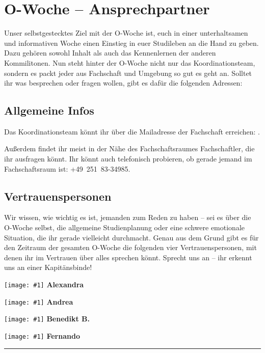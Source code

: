 \newcommand{\fibelvp}[2]{
	\minipage{0.24\textwidth}
		\begin{centering}
			\texttt{[image: \#1]}
			\textbf{#2}
		\end{centering}
	\endminipage\hfill
}

\section{O-Woche -- Ansprechpartner}

Unser selbstgestecktes Ziel mit der O-Woche ist, euch in einer unterhaltsamen und informativen Woche einen
Einstieg in euer Studileben an die Hand zu geben. Dazu gehören sowohl Inhalt als auch das Kennenlernen der
anderen Kommilitonen. Nun steht hinter der O-Woche nicht nur das Koordinationsteam, sondern es packt jeder
aus Fachschaft und Umgebung so gut es geht an. Solltet ihr was besprechen oder fragen wollen, gibt es dafür die
folgenden Adressen:

\subsection{Allgemeine Infos}
Das Koordinationsteam könnt ihr über die Mailadresse der Fachschaft erreichen: .

Außerdem findet ihr meist in der Nähe des Fachschaftsraumes Fachschaftler, die ihr ausfragen könnt. Ihr könnt
auch telefonisch probieren, ob gerade jemand im Fachschaftsraum ist: +49~251~83-34985.

\subsection{Vertrauenspersonen}
Wir wissen, wie wichtig es ist, jemanden zum Reden zu haben -- sei es über die O-Woche selbst, die
allgemeine Studienplanung oder eine schwere emotionale Situation, die ihr gerade vielleicht durchmacht. Genau aus dem Grund
gibt es für den Zeitraum der gesamten O-Woche die folgenden vier Vertrauenspersonen, mit denen ihr im Vertrauen über
alles sprechen könnt. Sprecht uns an -- ihr erkennt uns an einer Kapitänsbinde!

\fibelvp{res/vorstellungsfotos/alexandra_everwand.png}{Alexandra}
\fibelvp{res/vorstellungsfotos/andrea_garner_cropped.JPG}{Andrea}
\fibelvp{res/vorstellungsfotos/benedikt_bieringer.png}{Benedikt B.}
\fibelvp{res/vorstellungsfotos/fernando_romahn.png}{Fernando}

\rule{2cm}{0.4pt}

\fibelnotesimgsmall
